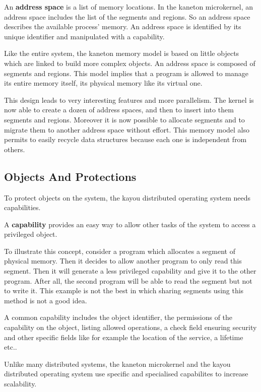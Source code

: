\begin{multicols}{2}
An \textbf{address space} is a list of memory locations. In the kaneton
microkernel, an address space includes the list of the segments and regions.
So an address space describes the available process' memory. An address space
is identified by its unique identifier and manipulated with a capability.

Like the entire system, the kaneton memory model is based on little objects
which are linked to build more complex objects. An address space is composed
of segments and regions. This model implies that a program is allowed to
manage its entire memory itself, its physical memory like its virtual one.

This design leads to very interesting features and more parallelism.
The kernel is now able to create a dozen of address spaces, and then to
insert into them segments and regions. Moreover it is now possible to allocate
segments and to migrate them to another address space without effort. This
memory model also permits to easily recycle data structures because each one
is independent from others.

%
%

\subsection{Objects And Protections}

To protect objects on the system, the kayou distributed operating system needs
capabilities.

A \textbf{capability} provides an easy way to allow other tasks of the
system to access a privileged object.

To illustrate this concept, consider a program which allocates a segment of
physical memory. Then it decides to allow another program to only read
this segment. Then it will generate a less privileged capability and give
it to the other program. After all, the second program will be able to read
the segment but not to write it. This example is not the best in which sharing
segments using this method is not a good idea.

A common capability includes the object identifier, the permissions of the
capability on the object, listing allowed operations, a check field ensuring
security and other specific fields like for example the location of the
service, a lifetime etc..

Unlike many distributed systems, the kaneton microkernel and the kayou
distributed operating system use specific and specialised capabilites to
increase scalability.


\end{multicols}

